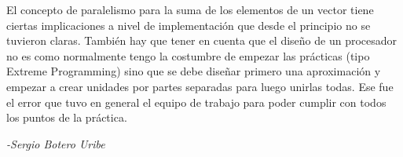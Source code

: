 El concepto de paralelismo para la suma de los elementos de un vector tiene ciertas implicaciones a nivel
de implementación que desde el principio no se tuvieron claras. También hay que tener en cuenta que
el diseño de un procesador no es como normalmente tengo la costumbre de empezar las prácticas (tipo Extreme
Programming) sino que se debe diseñar primero una aproximación y empezar a crear unidades por partes
separadas para luego unirlas todas. Ese fue el error que tuvo en general el equipo de trabajo para poder
cumplir con todos los puntos de la práctica.

\begin{flushright} 
	\itshape{-Sergio Botero Uribe}
\end{flushright}